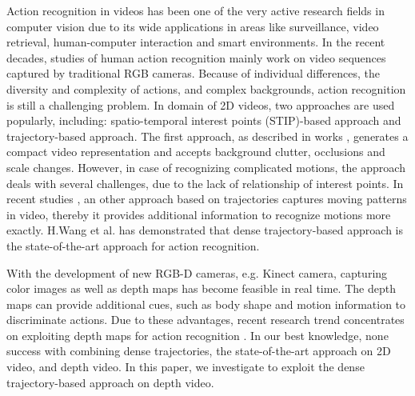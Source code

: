 \documentclass[review]{elsarticle}
\begin{document}
Action recognition in videos has been one of the very active research fields in computer vision \cite{pirsiavash2012detecting, poppe2010survey} due to its wide applications in areas like surveillance, video retrieval, human-computer interaction and smart environments.
In the recent decades, studies of human action recognition mainly work on video sequences captured by traditional RGB cameras.
Because of individual differences, the diversity and complexity of actions, and complex backgrounds, action recognition is still a challenging problem.
In domain of 2D videos, two approaches are used popularly, including: spatio-temporal interest points (STIP)-based approach and trajectory-based approach.
The first approach, as described in works \cite{laptev2005space, dollar2005behavior, laptev2008learning, bregonzio2009recognising, klaser2008aspatiotemporal, willems2008efficient}, generates a compact video representation and accepts background clutter, occlusions and scale changes.
However, in case of recognizing complicated motions, the approach deals with several challenges, due to the lack of relationship of interest points.
In recent studies \cite{matikainen2009trajectons, messing2009activity, sun2009hierarchical}, an other approach based on trajectories captures moving patterns in video, thereby it provides additional information to recognize motions more exactly.
H.Wang et al. \cite{wang2011densetraj} has demonstrated that dense trajectory-based approach is the state-of-the-art approach for action recognition.

With the development of new RGB-D cameras, e.g. Kinect camera, capturing color images as well as depth maps has become feasible in real time.
The depth maps can provide additional cues, such as body shape and motion information to discriminate actions.
Due to these advantages, recent research trend concentrates on exploiting depth maps for action recognition \cite{li2010action, wang2012mining, yang2012eigenjoints, yang2012recognizing, xia2011human, xia2012view, xia2013spatio, oreifej2013hon4d, vieira2012stop, wang2012robust}.
In our best knowledge, none success with combining dense trajectories, the state-of-the-art approach on 2D video, and depth video.
In this paper, we investigate to exploit the dense trajectory-based approach on depth video.
\end{document}
